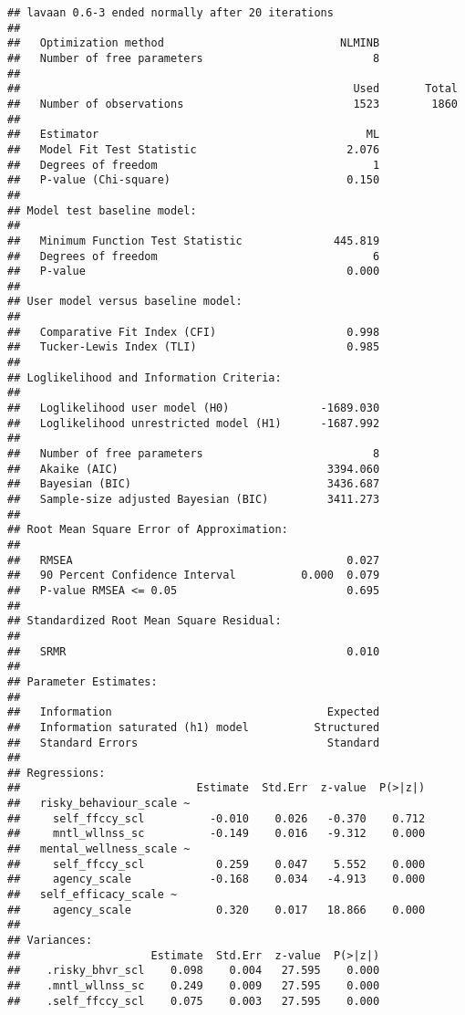 \documentclass[9pt,]{article}
\begin{document}
\begin{verbatim}
## lavaan 0.6-3 ended normally after 20 iterations
## 
##   Optimization method                           NLMINB
##   Number of free parameters                          8
## 
##                                                   Used       Total
##   Number of observations                          1523        1860
## 
##   Estimator                                         ML
##   Model Fit Test Statistic                       2.076
##   Degrees of freedom                                 1
##   P-value (Chi-square)                           0.150
## 
## Model test baseline model:
## 
##   Minimum Function Test Statistic              445.819
##   Degrees of freedom                                 6
##   P-value                                        0.000
## 
## User model versus baseline model:
## 
##   Comparative Fit Index (CFI)                    0.998
##   Tucker-Lewis Index (TLI)                       0.985
## 
## Loglikelihood and Information Criteria:
## 
##   Loglikelihood user model (H0)              -1689.030
##   Loglikelihood unrestricted model (H1)      -1687.992
## 
##   Number of free parameters                          8
##   Akaike (AIC)                                3394.060
##   Bayesian (BIC)                              3436.687
##   Sample-size adjusted Bayesian (BIC)         3411.273
## 
## Root Mean Square Error of Approximation:
## 
##   RMSEA                                          0.027
##   90 Percent Confidence Interval          0.000  0.079
##   P-value RMSEA <= 0.05                          0.695
## 
## Standardized Root Mean Square Residual:
## 
##   SRMR                                           0.010
## 
## Parameter Estimates:
## 
##   Information                                 Expected
##   Information saturated (h1) model          Structured
##   Standard Errors                             Standard
## 
## Regressions:
##                           Estimate  Std.Err  z-value  P(>|z|)
##   risky_behaviour_scale ~                                    
##     self_ffccy_scl          -0.010    0.026   -0.370    0.712
##     mntl_wllnss_sc          -0.149    0.016   -9.312    0.000
##   mental_wellness_scale ~                                    
##     self_ffccy_scl           0.259    0.047    5.552    0.000
##     agency_scale            -0.168    0.034   -4.913    0.000
##   self_efficacy_scale ~                                      
##     agency_scale             0.320    0.017   18.866    0.000
## 
## Variances:
##                    Estimate  Std.Err  z-value  P(>|z|)
##    .risky_bhvr_scl    0.098    0.004   27.595    0.000
##    .mntl_wllnss_sc    0.249    0.009   27.595    0.000
##    .self_ffccy_scl    0.075    0.003   27.595    0.000
\end{verbatim}
\end{document}
